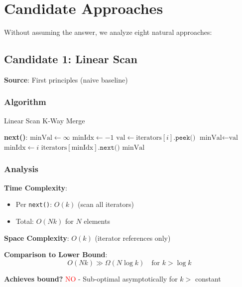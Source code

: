 \documentclass[11pt]{article}
\begin{document}
\section{Candidate Approaches}

Without assuming the answer, we analyze eight natural approaches:

\subsection{Candidate 1: Linear Scan}

\textbf{Source}: First principles (naive baseline)

\subsubsection{Algorithm}

\begin{algorithm}
\caption{Linear Scan K-Way Merge}
\begin{algorithmic}[1]
\State \textbf{next()}:
\State $\text{minVal} \gets \infty$
\State $\text{minIdx} \gets -1$
        \State $\text{val} \gets \text{iterators}[i].\texttt{peek()}$
            \State $\text{minVal} \gets \text{val}$
            \State $\text{minIdx} \gets i$
        \EndIf
    \EndIf
\EndFor
\State $\text{iterators}[\text{minIdx}].\texttt{next()}$
\State \Return $\text{minVal}$
\end{algorithmic}
\end{algorithm}

\subsubsection{Analysis}

\textbf{Time Complexity}:
\begin{itemize}
    \item Per \texttt{next()}: $O(k)$ (scan all iterators)
    \item Total: $O(Nk)$ for $N$ elements
\end{itemize}

\textbf{Space Complexity}: $O(k)$ (iterator references only)

\textbf{Comparison to Lower Bound}:
\[
O(Nk) \gg \Omega(N \log k) \quad \text{for } k > \log k
\]

\textbf{Achieves bound?} \textcolor{red}{NO} - Sub-optimal asymptotically for $k > $ constant
\end{document}
